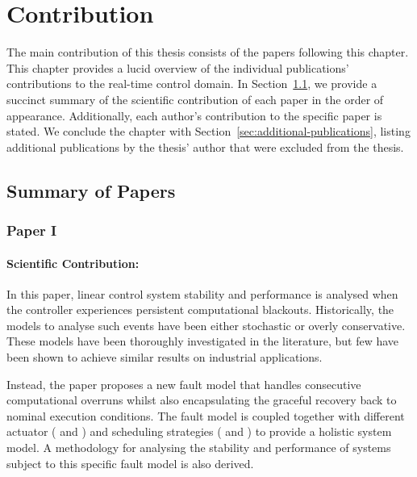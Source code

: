 \chapter{Contribution}

The main contribution of this thesis consists of the  papers following this chapter.
This chapter provides a lucid overview of the individual publications' contributions to the real-time control domain.
In Section~\ref{sec:paper-summaries}, we provide a succinct summary of the scientific contribution of each paper in the order of appearance.
Additionally, each author's contribution to the specific paper is stated.
We conclude the chapter with Section~\ref{sec:additional-publications}, listing additional publications by the thesis' author that were excluded from the thesis.

\clearpage %

\section{Summary of Papers}%
\label{sec:paper-summaries}%
%
\subsection*{Paper I}%
%
\begin{quote}
\end{quote}

\subsubsection*{Scientific Contribution:}%
%
In this paper, linear control system stability and performance is analysed when the controller experiences persistent computational blackouts.
Historically, the models to analyse such events have been either stochastic or overly conservative.
These models have been thoroughly investigated in the literature, but few have been shown to achieve similar results on industrial applications.

Instead, the paper proposes a new fault model that handles consecutive computational overruns whilst also encapsulating the graceful recovery back to nominal execution conditions.
The fault model is coupled together with different actuator (\tZ{} and \tH{}) and scheduling strategies (\tK{} and \tS{}) to provide a holistic system model.
A methodology for analysing the stability and performance of systems subject to this specific fault model is also derived. 

